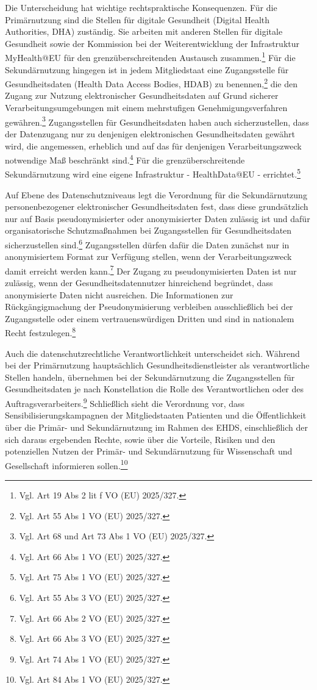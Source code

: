 Die Unterscheidung hat wichtige rechtspraktische Konsequenzen. Für die Primärnutzung sind die Stellen für digitale Gesundheit (Digital Health Authorities, DHA) zuständig. Sie arbeiten mit anderen Stellen für digitale Gesundheit sowie der Kommission bei der Weiterentwicklung  der Infrastruktur MyHealth@EU für den grenzüberschreitenden Austausch zusammen.\footnote{Vgl. Art 19 Abs 2 lit f VO (EU) 2025/327.} Für die Sekundärnutzung hingegen ist in jedem Mitgliedstaat eine Zugangsstelle für Gesundheitsdaten (Health Data Access Bodies, HDAB) zu benennen,\footnote{Vgl. Art 55 Abs 1 VO (EU) 2025/327.} die den Zugang zur Nutzung elektronischer Gesundheitsdaten auf Grund sicherer Verarbeitungsumgebungen mit einem mehrstufigen Genehmigungsverfahren gewähren.\footnote{Vgl. Art 68 und Art 73 Abs 1 VO (EU) 2025/327.} Zugangsstellen für Gesundheitsdaten haben auch sicherzustellen, dass der Datenzugang nur zu denjenigen elektronischen Gesundheitsdaten gewährt wird, die angemessen, erheblich und auf das für denjenigen Verarbeitungszweck notwendige Maß beschränkt sind.\footnote{Vgl. Art 66 Abs 1 VO (EU) 2025/327.}
Für die grenzüberschreitende Sekundärnutzung wird eine eigene Infrastruktur - HealthData@EU - errichtet.\footnote{Vgl. Art 75 Abs 1 VO (EU) 2025/327.}

Auf Ebene des Datenschutzniveaus legt die Verordnung für die Sekundärnutzung personenbezogener elektronischer Gesundheitsdaten fest, dass diese grundsätzlich nur auf Basis pseudonymisierter oder anonymisierter Daten zulässig ist und dafür organisatorische Schutzmaßnahmen bei Zugangsstellen für Gesundheitsdaten sicherzustellen sind.\footnote{Vgl. Art 55 Abs 3 VO (EU) 2025/327.} Zugangsstellen dürfen dafür die Daten zunächst nur in anonymisiertem Format zur Verfügung  stellen, wenn der Verarbeitungszweck damit erreicht werden kann.\footnote{Vgl. Art 66 Abs 2 VO (EU) 2025/327.}
Der Zugang zu pseudonymisierten Daten ist nur zulässig, wenn der Gesundheitsdatennutzer hinreichend begründet, dass anonymisierte Daten nicht ausreichen. Die Informationen zur Rückgängigmachung der Pseudonymisierung verbleiben ausschließlich bei der Zugangsstelle oder einem vertrauenswürdigen Dritten und sind in nationalem Recht festzulegen.\footnote{Vgl. Art 66 Abs 3 VO (EU) 2025/327.}

Auch die datenschutzrechtliche Verantwortlichkeit unterscheidet sich. Während bei der Primärnutzung hauptsächlich Gesundheitsdienstleister als verantwortliche Stellen handeln, übernehmen bei der Sekundärnutzung die Zugangsstellen für Gesundheitsdaten je nach Konstellation die Rolle des Verantwortlichen oder des Auftragsverarbeiters.\footnote{Vgl. Art 74 Abs 1 VO (EU) 2025/327.} Schließlich sieht die Verordnung vor, dass Sensibilisierungskampagnen der Mitgliedstaaten Patienten und die Öffentlichkeit über die Primär- und Sekundärnutzung im Rahmen des EHDS, einschließlich der sich daraus ergebenden Rechte, sowie über die Vorteile, Risiken und den potenziellen Nutzen der Primär- und Sekundärnutzung für Wissenschaft und Gesellschaft informieren sollen.\footnote{Vgl. Art 84 Abs 1 VO (EU) 2025/327.}

